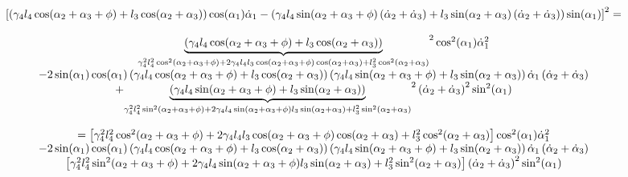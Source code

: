 \documentclass{article}
\begin{document}
\[
\begin{array}{c}
\left[ \left( \gamma _{4}l_{4}\cos (\alpha _{2}+\alpha _{3}+\phi )+l_{3}\cos
(\alpha _{2}+\alpha _{3})\right) \cos (\alpha _{1})\dot{\alpha}_{1}-\left(
\gamma _{4}l_{4}\sin (\alpha _{2}+\alpha _{3}+\phi )\left( \dot{\alpha}_{2}+%
\dot{\alpha}_{3}\right) +l_{3}\sin (\alpha _{2}+\alpha _{3})\left( \dot{%
\alpha}_{2}+\dot{\alpha}_{3}\right) \right) \sin (\alpha _{1})\right] ^{2}=
\\ 
\\ 
\underset{\gamma _{4}^{2}l_{4}^{2}\cos ^{2}(\alpha _{2}+\alpha _{3}+\phi
)+2\gamma _{4}l_{4}l_{3}\cos (\alpha _{2}+\alpha _{3}+\phi )\cos (\alpha
_{2}+\alpha _{3})+l_{3}^{2}\cos ^{2}(\alpha _{2}+\alpha _{3})}{\underbrace{%
\left( \gamma _{4}l_{4}\cos (\alpha _{2}+\alpha _{3}+\phi )+l_{3}\cos
(\alpha _{2}+\alpha _{3})\right) }}^{2}\cos ^{2}(\alpha _{1})\dot{\alpha}%
_{1}^{2} \\ 
-2\sin (\alpha _{1})\cos (\alpha _{1})\left( \gamma _{4}l_{4}\cos (\alpha
_{2}+\alpha _{3}+\phi )+l_{3}\cos (\alpha _{2}+\alpha _{3})\right) \left(
\gamma _{4}l_{4}\sin (\alpha _{2}+\alpha _{3}+\phi )+l_{3}\sin (\alpha
_{2}+\alpha _{3})\right) \dot{\alpha}_{1}\left( \dot{\alpha}_{2}+\dot{\alpha}%
_{3}\right)  \\ 
+\underset{\gamma _{4}^{2}l_{4}^{2}\sin ^{2}(\alpha _{2}+\alpha _{3}+\phi
)+2\gamma _{4}l_{4}\sin (\alpha _{2}+\alpha _{3}+\phi )l_{3}\sin (\alpha
_{2}+\alpha _{3})+l_{3}^{2}\sin ^{2}(\alpha _{2}+\alpha _{3})}{\underbrace{%
\left( \gamma _{4}l_{4}\sin (\alpha _{2}+\alpha _{3}+\phi )+l_{3}\sin
(\alpha _{2}+\alpha _{3})\right) }}^{2}\left( \dot{\alpha}_{2}+\dot{\alpha}%
_{3}\right) ^{2}\sin ^{2}(\alpha _{1}) \\ 
\\ 
=\left[ \gamma _{4}^{2}l_{4}^{2}\cos ^{2}(\alpha _{2}+\alpha _{3}+\phi
)+2\gamma _{4}l_{4}l_{3}\cos (\alpha _{2}+\alpha _{3}+\phi )\cos (\alpha
_{2}+\alpha _{3})+l_{3}^{2}\cos ^{2}(\alpha _{2}+\alpha _{3})\right] \cos
^{2}(\alpha _{1})\dot{\alpha}_{1}^{2} \\ 
-2\sin (\alpha _{1})\cos (\alpha _{1})\left( \gamma _{4}l_{4}\cos (\alpha
_{2}+\alpha _{3}+\phi )+l_{3}\cos (\alpha _{2}+\alpha _{3})\right) \left(
\gamma _{4}l_{4}\sin (\alpha _{2}+\alpha _{3}+\phi )+l_{3}\sin (\alpha
_{2}+\alpha _{3})\right) \dot{\alpha}_{1}\left( \dot{\alpha}_{2}+\dot{\alpha}%
_{3}\right)  \\ 
\left[ \gamma _{4}^{2}l_{4}^{2}\sin ^{2}(\alpha _{2}+\alpha _{3}+\phi
)+2\gamma _{4}l_{4}\sin (\alpha _{2}+\alpha _{3}+\phi )l_{3}\sin (\alpha
_{2}+\alpha _{3})+l_{3}^{2}\sin ^{2}(\alpha _{2}+\alpha _{3})\right] \left( 
\dot{\alpha}_{2}+\dot{\alpha}_{3}\right) ^{2}\sin ^{2}(\alpha _{1})%
\end{array}%
\]%
\end{document}

